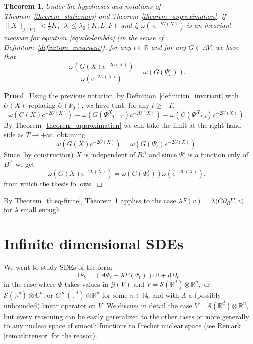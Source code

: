 \documentclass{article}
\newcommand{\mathd}{\mathrm{d}}
\newenvironment{proof}{\noindent\textbf{Proof\ }}{\hspace*{\fill}$\Box$\medskip}
\newtheorem{theorem}{Theorem}
\begin{document}
\begin{theorem}
  \label{theorem_invariant2}Under the hypotheses and notations of
  Theorem~\ref{theorem_stationary} and Theorem~\ref{theorem_approximation}, if
  $\| X \|_{\mathcal{G} (V)} < \frac{1}{3} K$, $| \lambda | \leqslant
  \lambda_0 (K, L, F)$ and if $\omega (\cdot e^{- 2 U (X)})$ is an invariant
  measure for equation~{\eqref{eq:sde-lambda}} (in the sense of
  Definition~\ref{definition_invariant}), for any $t \in \mathbb{R}$ and for
  any $G \in \Lambda V$, we have that
  \[ \frac{\omega (G (X) e^{- 2 U (X)})}{\omega (e^{- 2 U (X)})} = \omega (G
     (\Psi^s_t)) . \]
\end{theorem}

\begin{proof}
  Using the previous notation, by Definition~\ref{definition_invariant} with
  $U (X)$ replacing $U (\Psi_0)$, we have that, for any $t \geqslant - T$,
  \[ \omega (G (X) e^{- 2 U (X)}) = \omega (G (\Psi_{- T, - T}^X) e^{- 2 U
     (X)}) = \omega (G (\Psi_{- T, t}^X) e^{- 2 U (X)}) . \]
  By Theorem~\ref{theorem_approximation} we can take the limit at the right
  hand side as $T \rightarrow + \infty$, obtaining
  \[ \omega (G (X) e^{- 2 U (X)}) = \omega (G (\Psi^s_t) e^{- 2 U (X)}) . \]
  Since (by construction) $X$ is independent of $B^A_t$ and since $\Psi^s_t$
  is a function only of $B^A$ we get
  \[ \omega (G (X) e^{- 2 U (X)}) = \omega (G (\Psi^s_t)) \omega (e^{- 2 U
     (X)}), \]
  from which the thesis follows.
\end{proof}

\begin{remark}
  \label{remark_invariant2}By Theorem~\ref{th:sq-finite},
  Theorem~\ref{theorem_invariant2} applies to the case $\lambda F (v) =
  \lambda \langle C \partial_R U, v \rangle$ for $\lambda$ small enough.
\end{remark}

\section{Infinite dimensional SDEs}\label{sec:infinite-dim}

We want to study SDEs of the form
\begin{equation}
  \mathd \Psi_t = (A \Psi_t + \lambda F (\Psi_t)) \mathd t + \mathd B_t
  \label{eq:infinite5}
\end{equation}
in the case where $\Psi$ takes values in $\mathcal{G} (V)$ and $V =\mathcal{S}
(\mathbb{R}^d) \otimes \mathbb{R}^n,$ or $\mathcal{S} (\mathbb{R}^d) \otimes
\mathbb{C}^n$, or $C^{\infty} (\mathbb{T}^d) \otimes \mathbb{R}^n$ for some $n
\in \mathbb{N}_0$ and with $A$ a (possibly unbounded) linear operator on $V$.
We discuss in detail the case $V = \mathcal{S} (\mathbb{R}^d) \otimes
\mathbb{R}^n$, but every reasoning can be easily generalized to the other
cases or more generally to any nuclear space of smooth functions to
Fr{\'e}chet nuclear space (see Remark \ref{remark:tensor} for the reason).
\end{document}
